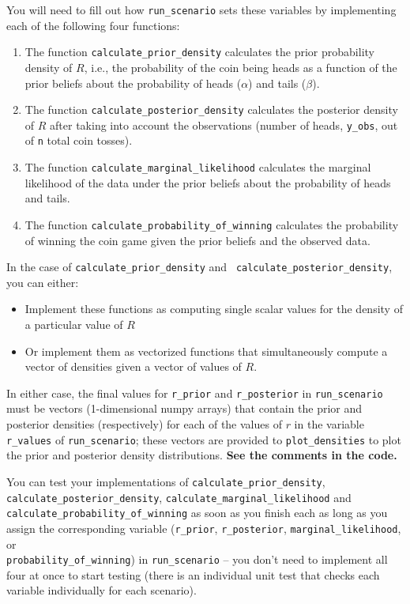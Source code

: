 \documentclass[10pt]{article}
\begin{document}
\begin{itemize}
You will need to fill out how {\tt run\_scenario} sets these variables by implementing each of the following four functions:
\begin{enumerate}
\item The function {\tt calculate\_prior\_density} calculates the prior
    probability density of $R$, i.e., the probability of the coin being heads as a function of the prior beliefs about the probability of heads ($\alpha$) and tails ($\beta$).
\item The function {\tt calculate\_posterior\_density} calculates the posterior density of $R$ after taking into account the observations (number of heads, {\tt y\_obs}, out of {\tt n} total coin tosses).
\item The function {\tt calculate\_marginal\_likelihood} calculates the marginal likelihood of the data under the prior beliefs about the probability of heads and tails.
\item The function {\tt calculate\_probability\_of\_winning} calculates the probability of winning the coin game given the prior beliefs and the observed data.
\end{enumerate}

In the case of {\tt calculate\_prior\_density} and {\tt
calculate\_posterior\_density}, you can either:
\begin{itemize}
    \item Implement these functions as computing single scalar values for the density of a particular
value of $R$
\item Or implement them as vectorized functions that
simultaneously compute a vector of densities given a vector of values of $R$. 
\end{itemize}

In either case, the final values for {\tt r\_prior} and {\tt r\_posterior} in {\tt run\_scenario} must be vectors (1-dimensional numpy arrays) that contain the prior and posterior densities (respectively) for each of the values of $r$ in the variable {\tt r\_values} of {\tt run\_scenario}; these vectors are provided to {\tt plot\_densities} to plot the prior and posterior density distributions. \textbf{See the comments in the code.}

You can test your implementations of {\tt calculate\_prior\_density}, {\tt calculate\_posterior\_density}, {\tt calculate\_marginal\_likelihood} and {\tt calculate\_probability\_of\_winning} as soon as you finish each as long as you assign the corresponding variable
({\tt r\_prior},
{\tt r\_posterior},
{\tt marginal\_likelihood}, or \\
{\tt probability\_of\_winning})
in {\tt run\_scenario} -- you don't need to implement all four at once to start testing (there is an individual unit test that checks each variable individually for each scenario).


\end{itemize}
\end{document}
